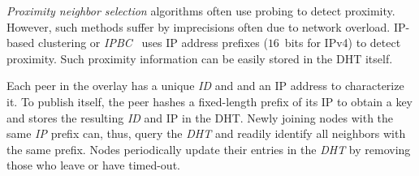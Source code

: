 \emph{Proximity neighbor selection} algorithms often 
use probing to detect proximity. 
However, such methods suffer by imprecisions often due to network overload.
IP-based clustering or \emph{IPBC}~\cite{KM2007} uses IP address prefixes
($16$~bits for IPv4) to detect proximity.
Such proximity information 
can be easily stored in the DHT itself.

Each peer in the overlay has a unique \emph{ID} and and an IP address to
characterize it. 
To publish itself, the peer hashes a fixed-length prefix of 
its IP to obtain a key and stores the resulting \emph{ID} and IP 
in the DHT. 
Newly joining nodes with the same {\sl IP} prefix 
can, thus, query the \emph{DHT} and readily identify all 
neighbors with the same prefix. 
Nodes periodically update their entries in the \emph{DHT} 
by removing those who leave or have timed-out.

